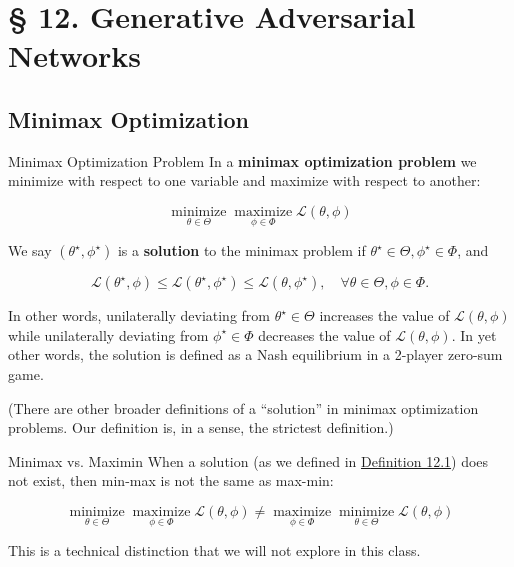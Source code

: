 \section{§ 12. Generative Adversarial Networks}

\subsection{Minimax Optimization}

\begin{frame}[allowframebreaks]

\begin{mydefinitionblock}{12.1}{Minimax Optimization Problem}
    In a \textbf{minimax optimization problem} we minimize with respect to one variable and maximize with respect to another:

    $$
    \underset{\theta \in \Theta}{\operatorname{minimize}} \underset{\phi \in \Phi}{\operatorname{maximize}} \mathcal{L}(\theta, \phi)
    $$

    We say $\left(\theta^{\star}, \phi^{\star}\right)$ is a \textbf{solution} to the minimax problem if $\theta^{\star} \in \Theta, \phi^{\star} \in \Phi$, and

    $$
    \mathcal{L}\left(\theta^{\star}, \phi\right) \leq \mathcal{L}\left(\theta^{\star}, \phi^{\star}\right) \leq \mathcal{L}\left(\theta, \phi^{\star}\right), \quad \forall \theta \in \Theta, \phi \in \Phi .
    $$

    In other words, unilaterally deviating from $\theta^{\star} \in \Theta$ increases the value of $\mathcal{L}(\theta, \phi)$ while unilaterally deviating from $\phi^{\star} \in \Phi$ decreases the value of $\mathcal{L}(\theta, \phi)$. In yet other words, the solution is defined as a Nash equilibrium in a 2-player zero-sum game.

    (There are other broader definitions of a “solution” in minimax optimization problems. Our definition is, in a sense, the strictest definition.)
\end{mydefinitionblock}

\end{frame}

\begin{frame}[allowframebreaks]

\begin{myconceptblock}{12.2}{Minimax vs. Maximin}
    When a solution (as we defined in \hyperref[definition:12.1]{Definition 12.1}) does not exist, then min-max is not the same as max-min:

    $$
    \underset{\theta \in \Theta}{\operatorname{minimize}} \underset{\phi \in \Phi}{\operatorname{maximize}} \mathcal{L}(\theta, \phi) \neq \underset{\phi \in \Phi}{\operatorname{maximize}} \underset{\theta \in \Theta}{\operatorname{minimize}} \mathcal{L}(\theta, \phi)
    $$

    This is a technical distinction that we will not explore in this class.
\end{myconceptblock}

\end{frame}

